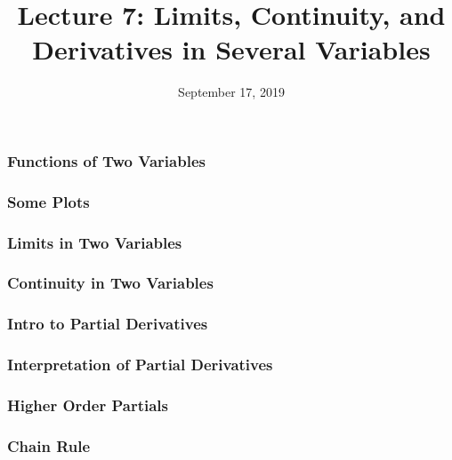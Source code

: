 \documentclass{beamer}
\title{Lecture 7: Limits, Continuity, and Derivatives in Several Variables}
\date{September 17, 2019}
\begin{document}
	
\frame{\titlepage}


\begin{frame}
\frametitle{Functions of Two Variables}
\end{frame}

\begin{frame}
\frametitle{Some Plots}
\end{frame}

\begin{frame}
\frametitle{Limits in Two Variables}
\end{frame}

\begin{frame}
\frametitle{Continuity in Two Variables}
\end{frame}

\begin{frame}
\frametitle{Intro to Partial Derivatives}
\end{frame}

\begin{frame}
\frametitle{Interpretation of Partial Derivatives}
\end{frame}

\begin{frame}
\frametitle{Higher Order Partials}
\end{frame}

\begin{frame}
\frametitle{Chain Rule}
\end{frame}


%		
%		
%
%
%
%
\end{document}
